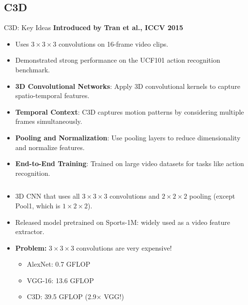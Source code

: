 \subsection{C3D}

\begin{frame}[allowframebreaks]{C3D: Key Ideas}
    \textbf{Introduced by Tran et al., ICCV 2015}

    \begin{itemize}
        \item Uses $3 \times 3 \times 3$ convolutions on 16-frame video clips.
        \item Demonstrated strong performance on the UCF101 action recognition benchmark.
    \end{itemize}
    \begin{itemize}
        \item \textbf{3D Convolutional Networks}: Apply 3D convolutional kernels to capture spatio-temporal features.
        \item \textbf{Temporal Context}: C3D captures motion patterns by considering multiple frames simultaneously.
        \item \textbf{Pooling and Normalization}: Use pooling layers to reduce dimensionality and normalize features.
        \item \textbf{End-to-End Training}: Trained on large video datasets for tasks like action recognition.
    \end{itemize}
\framebreak
    \begin{columns}[T,onlytextwidth]
        \begin{column}{0.6\textwidth}
            \begin{itemize}
                \setlength{\itemsep}{1em}
                \item 3D CNN that uses all $3 \times 3 \times 3$ convolutions and $2 \times 2 \times 2$ pooling (except Pool1, which is $1 \times 2 \times 2$).
                \item Released model pretrained on Sports-1M: widely used as a video feature extractor.
                \item \textbf{Problem:} $3 \times 3 \times 3$ convolutions are very expensive!
                \begin{itemize}
                    \item AlexNet: 0.7 GFLOP
                    \item VGG-16: 13.6 GFLOP
                    \item C3D: 39.5 GFLOP (2.9$\times$ VGG!)

\end{itemize}
\end{itemize}
\end{column}
\end{columns}
\end{frame}
